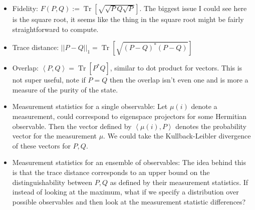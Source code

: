 \documentclass{article}
\newcommand{\brackets}[1]{\left[ #1 \right]}
\newcommand{\norm}[1]{\left| \left| #1 \right| \right|}
\newcommand{\anglebrackets}[1]{\left< #1 \right>}
\newcommand{\overlap}[2]{\anglebrackets{#1 , #2 }}
\DeclareMathOperator{\Tr}{Tr}
\newcommand{\trace}[1]{\Tr \brackets{ #1 }}
\begin{document}
\begin{itemize}
    \item Fidelity: $F(P, Q) := \trace{\sqrt{\sqrt{P} Q \sqrt{P}}}$. The biggest issue I could see here is the square root, it seems like the thing in the square root might be fairly straightforward to compute. 
    \item Trace distance: $\norm{P - Q}_1 = \trace{\sqrt{(P-Q)^*(P-Q)}}$
    \item Overlap: $\anglebrackets{P, Q} = \trace{P^* Q}$, similar to dot product for vectors. This is not super useful, note if $P = Q$ then the overlap isn't even one and is more a measure of the purity of the state. 
    \item Measurement statistics for a single observable: Let $\mu(i)$ denote a measurement, could correspond to eigenspace projectors for some Hermitian observable. Then the vector defined by $\overlap{\mu(i)}{P}$ denotes the probability vector for the measurement $\mu$. We could take the Kullback-Leibler divergence of these vectors for $P, Q$.
    \item Measurement statistics for an ensemble of observables: The idea behind this is that the trace distance corresponds to an upper bound on the distinguishability between $P,Q$ as defined by their measurement statistics. If instead of looking at the maximum, what if we specify a distribution over possible observables and then look at the measurement statistic differences? 
\end{itemize}
\end{document}
